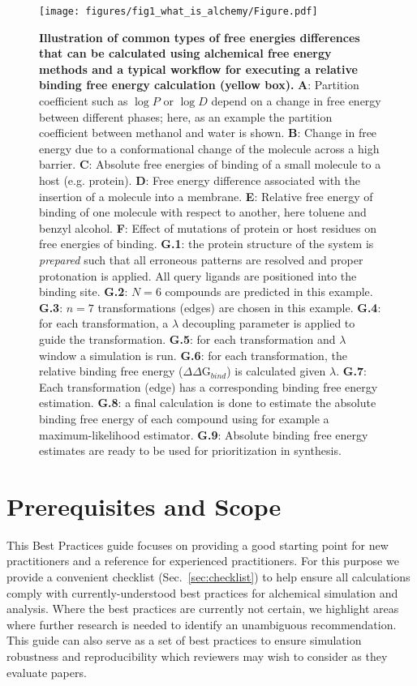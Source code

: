 \documentclass[9pt,bestpractices]{livecoms}
\begin{document}
\begin{figure}
    \centering\texttt{[image: figures/fig1\_what\_is\_alchemy/Figure.pdf]}   
    \caption{\textbf{Illustration of common types of free energies differences that can be calculated using alchemical free energy methods and a typical workflow for executing a relative binding free energy calculation (yellow box).} 
    \textbf{A}: Partition coefficient such as $\log P$ or $\log D$ depend on a change in free energy between different phases; here, as an example the partition coefficient between methanol and water is shown. \textbf{B}: Change in free energy due to a conformational change of the molecule across a high barrier. \textbf{C}: Absolute free energies of binding of a small molecule to a host (e.g. protein). \textbf{D}: Free energy difference associated with the insertion of a molecule into a membrane. \textbf{E}: Relative free energy of binding of one molecule with respect to another, here toluene and benzyl alcohol. \textbf{F}: Effect of mutations of protein or host residues on free energies of binding. 
    \textbf{G.1}: the protein structure of the system is \textit{prepared} such that all erroneous patterns are resolved and proper protonation is applied. All query ligands are positioned into the binding site. \textbf{G.2}: $N=6$ compounds are predicted in this example. \textbf{G.3}: $n=7$ transformations (edges) are chosen in this example. \textbf{G.4}: for each transformation, a $\lambda$ decoupling parameter is applied to guide the transformation. \textbf{G.5}: for each transformation and $\lambda$ window a simulation is run. \textbf{G.6}: for each transformation, the relative binding free energy ($\Delta\Delta$G$_{bind}$) is calculated given $\lambda$. \textbf{G.7}: Each transformation (edge) has a corresponding binding free energy estimation. \textbf{G.8}: a final calculation is done to estimate the absolute binding free energy of each compound using for example a maximum-likelihood estimator. \textbf{G.9}: Absolute binding free energy estimates are ready to be used for prioritization in synthesis. \label{fig:fig_what_is_alchemy}
    }
\end{figure}

\section{Prerequisites and Scope}
\label{sec:pre}

This Best Practices guide focuses on providing a good starting point for new practitioners and a reference for experienced practitioners. 
 For this purpose we provide a convenient checklist (Sec.~\ref{sec:checklist}) to help ensure all calculations comply with currently-understood best practices for alchemical simulation and analysis. Where the best practices are currently not certain, we highlight areas where further research is needed to identify an unambiguous recommendation.
 This guide can also serve as a set of best practices to ensure simulation robustness and reproducibility which reviewers may wish to consider as they evaluate papers.
\end{document}
